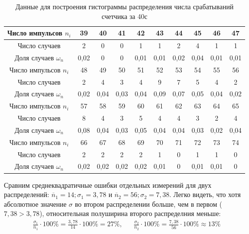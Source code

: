 \documentclass[a4paper,12pt]{article} %
\begin{document}
\begin{table}[h!]

\centering
\caption{Данные для построения гистограммы распределения числа срабатываний счетчика за 40с}
\label{table 4}
\begin{tabular}{|c|c|c|c|c|c|c|c|c|c|}
\hline
Число импульсов $n_i$  & 39   & 40 & 41 & 42   & 43   & 44   & 45   & 46   & 47   \\ \hline
Число случаев   &  2    & 0  & 0  & 1    & 1    & 2    & 4    & 1    & 1    \\ \hline
Доля случаев $\omega_n$   & 0,02 & 0  & 0  & 0,01 & 0,01 & 0,02 & 0,04 & 0,01 & 0,01 \\ \hline \hline
Число импульсов $n_i$  & 48   & 49   & 50   & 51   & 52   & 53   & 54   & 55   & 56   \\ \hline
Число случаев   & 2    & 4    & 3    & 4    & 9    & 7    & 5    & 4    & 2    \\ \hline
Доля случаев $\omega_n$   & 0,02 & 0,04 & 0,03 & 0,04 & 0,09 & 0,07 & 0,05 & 0,04 & 0,02 \\ \hline \hline
Число импульсов $n_i$  & 57   & 58   & 59   & 60   & 61   & 62   & 63   & 64   & 65   \\ \hline
Число случаев   & 8    & 4    & 3    & 5    & 4    & 4    & 3    & 2    & 4    \\ \hline
Доля случаев $\omega_n$   & 0,08 & 0,04 & 0,03 & 0,05 & 0,04 & 0,04 & 0,03 & 0,02 & 0,04 \\ \hline \hline
Число импульсов $n_i$  & 66   & 67   & 68   & 69   & 70   & 71 & 72   & 73   & 74 \\ \hline
Число случаев   & 2    & 2    & 2    & 2    & 1    & 0  & 1    & 1    & 0  \\ \hline
Доля случаев $\omega_n$   &0,02 & 0,02 & 0,02 & 0,02 & 0,01 & 0  & 0,01 & 0,01 & 0  \\ \hline
\end{tabular}
\end{table}
Сравним среднеквадратичные ошибки отдельных измерений для двух распределений: $\overline{n}_1 = 14; \sigma_1 = 3,78$ и $\overline{n}_2 = 56; \sigma_2 = 7,38$. Легко видеть, что хотя абсолютное значение $\sigma$ во втором распределении больше, чем в первом ($7,38>3,78$), относительная полуширина второго распределния меньше:
\[
\begin{aligned}
\frac{\sigma_1}{\overline{n}_1}\cdot 100\% = \frac{3,78}{14} \cdot 100\% = 27\%, & & \frac{\sigma_2}{\overline{n}_2}\cdot 100\% = \frac{7,38}{56} \cdot 100\% \approx 13\%\\
\end{aligned}
\]
\end{document}
